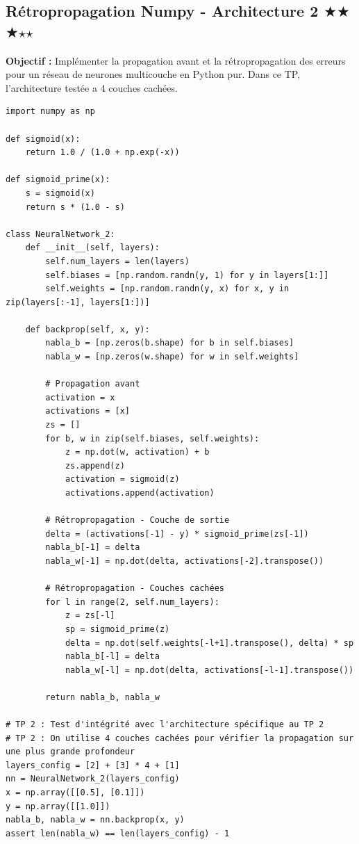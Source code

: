 \documentclass[11pt,a4paper]{article}
\begin{document}
\subsection*{Rétropropagation Numpy - Architecture 2 $\bigstar$$\bigstar$$\bigstar$$\star$$\star$}

\textbf{Objectif :}
Implémenter la propagation avant et la rétropropagation des erreurs pour un réseau de neurones multicouche en Python pur.
Dans ce TP, l'architecture testée a 4 couches cachées.

\begin{lstlisting}
import numpy as np

def sigmoid(x):
    return 1.0 / (1.0 + np.exp(-x))

def sigmoid_prime(x):
    s = sigmoid(x)
    return s * (1.0 - s)

class NeuralNetwork_2:
    def __init__(self, layers):
        self.num_layers = len(layers)
        self.biases = [np.random.randn(y, 1) for y in layers[1:]]
        self.weights = [np.random.randn(y, x) for x, y in zip(layers[:-1], layers[1:])]

    def backprop(self, x, y):
        nabla_b = [np.zeros(b.shape) for b in self.biases]
        nabla_w = [np.zeros(w.shape) for w in self.weights]

        # Propagation avant
        activation = x
        activations = [x]
        zs = []
        for b, w in zip(self.biases, self.weights):
            z = np.dot(w, activation) + b
            zs.append(z)
            activation = sigmoid(z)
            activations.append(activation)

        # Rétropropagation - Couche de sortie
        delta = (activations[-1] - y) * sigmoid_prime(zs[-1])
        nabla_b[-1] = delta
        nabla_w[-1] = np.dot(delta, activations[-2].transpose())

        # Rétropropagation - Couches cachées
        for l in range(2, self.num_layers):
            z = zs[-l]
            sp = sigmoid_prime(z)
            delta = np.dot(self.weights[-l+1].transpose(), delta) * sp
            nabla_b[-l] = delta
            nabla_w[-l] = np.dot(delta, activations[-l-1].transpose())

        return nabla_b, nabla_w

# TP 2 : Test d'intégrité avec l'architecture spécifique au TP 2
# TP 2 : On utilise 4 couches cachées pour vérifier la propagation sur une plus grande profondeur
layers_config = [2] + [3] * 4 + [1]
nn = NeuralNetwork_2(layers_config)
x = np.array([[0.5], [0.1]])
y = np.array([[1.0]])
nabla_b, nabla_w = nn.backprop(x, y)
assert len(nabla_w) == len(layers_config) - 1
\end{lstlisting}
\end{document}

